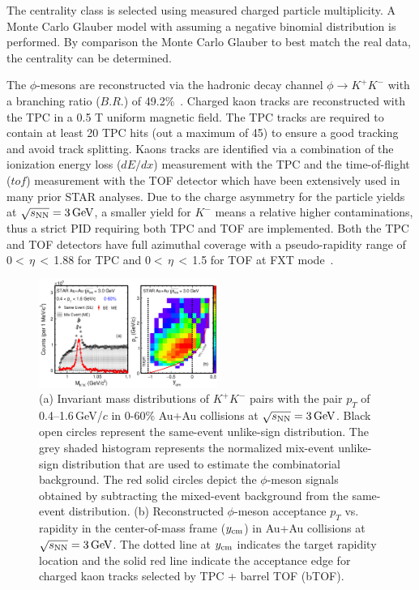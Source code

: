 \documentclass[%
 reprint,	
showpacs,
 amsmath,amssymb,
 aps,
 prc,
]{revtex4-1}
\begin{document}
The centrality class is selected using measured charged particle multiplicity. A Monte Carlo Glauber model with assuming a negative binomial distribution is performed. By comparison the Monte Carlo Glauber to best match the real data, the centrality can be determined.

The $\phi$-mesons are reconstructed via the hadronic decay channel $\phi\rightarrow K^+K^-$ with a branching ratio ($B.R.$) of 49.2\%~\cite{pdg}. Charged kaon tracks are reconstructed with the TPC in a 0.5 T uniform magnetic field. The TPC tracks are required to contain at least 20 TPC hits (out a maximum of 45) to ensure a good tracking and avoid track splitting. Kaons tracks are identified via a combination of the ionization energy loss ($dE/dx$) measurement with the TPC and the time-of-flight ($tof$) measurement with the TOF detector which have been extensively used in many prior STAR analyses. Due to the charge asymmetry for the particle yields at ${\sqrt{s_{\rm NN}} = \rm{3\,GeV}}$, a smaller yield for $K^-$ means a relative higher contaminations, thus a strict PID requiring both TPC and TOF are implemented. Both the TPC and TOF detectors have full azimuthal coverage with a pseudo-rapidity range of 0$<$\,$\eta$\,$<$\,1.88 for TPC and 0$<$\,$\eta$\,$<$\,1.5 for TOF at FXT mode~\cite{TPC,TOF}.



\begin{figure}
\centering
\includegraphics[width=0.52\textwidth]{fig/fig1_signal.eps}
  \caption{(a) Invariant mass distributions of $K^+K^-$ pairs with the pair $p_T$ of 0.4--1.6\,GeV/$c$ in 0-60\% Au+Au collisions at ${\sqrt{s_{\rm NN}} = \rm{3\,GeV}}$. Black open circles represent the same-event unlike-sign distribution. The grey shaded histogram represents the normalized mix-event unlike-sign distribution that are used to estimate the combinatorial background. The red solid circles depict the $\phi$-meson signals obtained by subtracting the mixed-event background from the same-event distribution. (b) Reconstructed $\phi$-meson acceptance $p_T$ vs. rapidity in the center-of-mass frame ($y_{\rm cm}$) in Au+Au collisions at ${\sqrt{s_{\rm NN}} = \rm{3\,GeV}}$. The dotted line at $y_{\rm cm}$ indicates the target rapidity location and the solid red line indicate the acceptance edge for charged kaon tracks selected by TPC + barrel TOF (bTOF).}
\label{fig:phiSignal} 
\end{figure}
\end{document}
